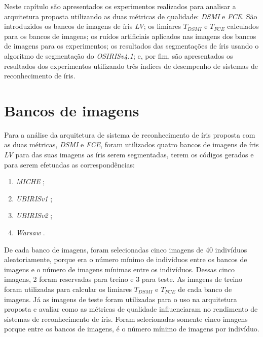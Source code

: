 
\par Neste capítulo são apresentados os experimentos realizados para analisar a arquitetura proposta utilizando as duas métricas de qualidade: \textit{\acrshort{DSMI}} e \textit{\acrshort{FCE}}. São introduzidos os bancos de imagens de íris \textit{\acrshort{LV}}; os limiares $T_{DSMI}$ e $T_{FCE}$ calculados para os bancos de imagens; os ruídos artificiais aplicados nas imagens dos bancos de imagens para os experimentos; os resultados das segmentações de íris usando o algoritmo de segmentação do \textit{OSIRISv4.1}; e, por fim, são apresentados os resultados dos experimentos utilizando três índices de desempenho de sistemas de reconhecimento de íris.


\section{Bancos de imagens} \label{sec:experimentos:db}

\par Para a análise da arquitetura de sistema de reconhecimento de íris proposta com as duas métricas, \textit{\acrshort{DSMI}} e \textit{\acrshort{FCE}}, foram utilizados quatro bancos de imagens de íris \textit{\acrshort{LV}} para das suas imagens as íris serem segmentadas, terem os códigos gerados e para serem efetuadas as correspondências: 

\begin{enumerate}
    \item \textit{MICHE} \cite{marsico2017-MICHE-1, santada2016-MICHE-2, miche};
    \item \textit{UBIRISv1} \cite{proenca2005-ubirisv1, ubirisv1};
    \item \textit{UBIRISv2} \cite{proence2010-ubirisv2, ubirisv2};
    \item \textit{\acrfull{Warsaw}} \cite{trokielwicz2016-Warsaw, warsaw}.
\end{enumerate}

\par De cada banco de imagens, foram selecionadas cinco imagens de 40 indivíduos aleatoriamente, porque era o número mínimo de indivíduos entre os bancos de imagens e o número de imagens mínimas entre os indivíduos. Dessas cinco imagens, 2 foram reservadas para treino e 3 para teste. As imagens de treino foram utilizadas para calcular os limiares $T_{DSMI}$ e $T_{FCE}$ de cada banco de imagens. Já as imagens de teste foram utilizadas para o uso na arquitetura proposta e avaliar como as métricas de qualidade influenciaram no rendimento de sistemas de reconhecimento de íris. Foram selecionadas somente cinco imagens porque entre os bancos de imagens, é o número mínimo de imagens por indivíduo.

